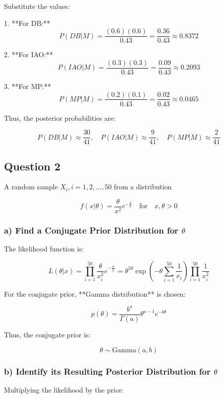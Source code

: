 \documentclass{article}
\begin{document}
Substitute the values:

1. **For DB:**
\[
P(DB | M) = \frac{(0.6)(0.6)}{0.43} = \frac{0.36}{0.43} \approx 0.8372
\]

2. **For IAO:**
\[
P(IAO | M) = \frac{(0.3)(0.3)}{0.43} = \frac{0.09}{0.43} \approx 0.2093
\]

3. **For MP:**
\[
P(MP | M) = \frac{(0.2)(0.1)}{0.43} = \frac{0.02}{0.43} \approx 0.0465
\]

Thus, the posterior probabilities are:

\[
P(DB | M) \approx \frac{30}{41}, \quad P(IAO | M) \approx \frac{9}{41}, \quad P(MP | M) \approx \frac{2}{41}
\]


\subsection*{Question 2}

A random sample \( X_i, i = 1, 2, \dots, 50 \) from a distribution

\[
f(x | \theta) = \frac{\theta}{x^2} e^{-\frac{\theta}{x}} \quad \text{for} \quad x, \theta > 0
\]

\subsubsection*{a) Find a Conjugate Prior Distribution for \( \theta \)}

The likelihood function is:

\[
L(\theta | x) = \prod_{i=1}^{50} \frac{\theta}{x_i^2} e^{-\frac{\theta}{x_i}} = \theta^{50} \exp \left( -\theta \sum_{i=1}^{50} \frac{1}{x_i} \right) \prod_{i=1}^{50} \frac{1}{x_i^2}
\]

For the conjugate prior, **Gamma distribution** is chosen:

\[
p(\theta) = \frac{b^a}{\Gamma(a)} \theta^{a-1} e^{-b \theta}
\]

Thus, the conjugate prior is:

\[
\theta \sim \text{Gamma}(a, b)
\]

\subsubsection*{b) Identify its Resulting Posterior Distribution for \( \theta \)}

Multiplying the likelihood by the prior:
\end{document}
